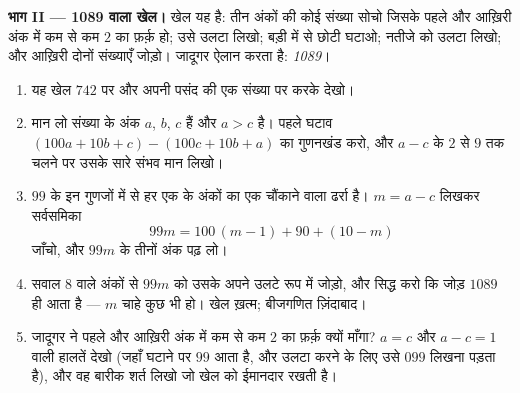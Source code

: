 \begin{problem}
\medskip
\noindent\textbf{भाग II --- 1089 वाला खेल।}
खेल यह है: तीन अंकों की कोई संख्या सोचो जिसके पहले और आख़िरी अंक में
कम से कम $2$ का फ़र्क़ हो; उसे उलटा लिखो; बड़ी में से छोटी घटाओ; नतीजे
को उलटा लिखो; और आख़िरी दोनों संख्याएँ जोड़ो। जादूगर ऐलान करता है:
\emph{1089}।
\begin{enumerate}[resume]
  \item यह खेल $742$ पर और अपनी पसंद की एक संख्या पर करके देखो।
  \item मान लो संख्या के अंक $a$, $b$, $c$ हैं और $a > c$ है। पहले
        घटाव $(100a + 10b + c) - (100c + 10b + a)$ का गुणनखंड करो,
        और $a - c$ के $2$ से $9$ तक चलने पर उसके सारे संभव मान
        लिखो।
  \item $99$ के इन गुणजों में से हर एक के अंकों का एक चौंकाने वाला
        ढर्रा है। $m = a - c$ लिखकर सर्वसमिका
        \[
        99m = 100\,(m - 1) + 90 + (10 - m)
        \]
        जाँचो, और $99m$ के तीनों अंक पढ़ लो।
  \item सवाल 8 वाले अंकों से $99m$ को उसके अपने उलटे रूप में जोड़ो,
        और सिद्ध करो कि जोड़ $1089$ ही आता है --- $m$ चाहे कुछ भी
        हो। खेल ख़त्म; बीजगणित ज़िंदाबाद।
  \item जादूगर ने पहले और आख़िरी अंक में कम से कम $2$ का फ़र्क़ क्यों
        माँगा? $a = c$ और $a - c = 1$ वाली हालतें देखो (जहाँ घटाने
        पर $99$ आता है, और उलटा करने के लिए उसे $099$ लिखना पड़ता
        है), और वह बारीक शर्त लिखो जो खेल को ईमानदार रखती है।
\end{enumerate}


\end{problem}
